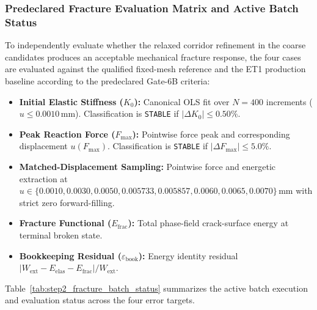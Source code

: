 


\subsubsection{Predeclared Fracture Evaluation Matrix and Active Batch Status}

To independently evaluate whether the relaxed corridor refinement in the coarse candidates produces an acceptable mechanical fracture response, the four cases are evaluated against the qualified fixed-mesh reference and the ET1 production baseline according to the predeclared Gate-6B criteria:
\begin{itemize}
  \item \textbf{Initial Elastic Stiffness ($K_0$):} Canonical OLS fit over $N=400$ increments ($u \le 0.0010\,\mathrm{mm}$). Classification is \texttt{STABLE} if $|\Delta K_0| \le 0.50\%$.
  \item \textbf{Peak Reaction Force ($F_{\max}$):} Pointwise force peak and corresponding displacement $u(F_{\max})$. Classification is \texttt{STABLE} if $|\Delta F_{\max}| \le 5.0\%$.
  \item \textbf{Matched-Displacement Sampling:} Pointwise force and energetic extraction at $u \in \{0.0010, 0.0030, 0.0050, 0.005733, 0.005857, 0.0060, 0.0065, 0.0070\}\,\mathrm{mm}$ with strict zero forward-filling.
  \item \textbf{Fracture Functional ($E_{\mathrm{frac}}$):} Total phase-field crack-surface energy at terminal broken state.
  \item \textbf{Bookkeeping Residual ($\varepsilon_{\mathrm{book}}$):} Energy identity residual $|W_{\mathrm{ext}} - E_{\mathrm{elas}} - E_{\mathrm{frac}}| / W_{\mathrm{ext}}$.
\end{itemize}

Table~\ref{tab:step2_fracture_batch_status} summarizes the active batch execution and evaluation status across the four error targets.

